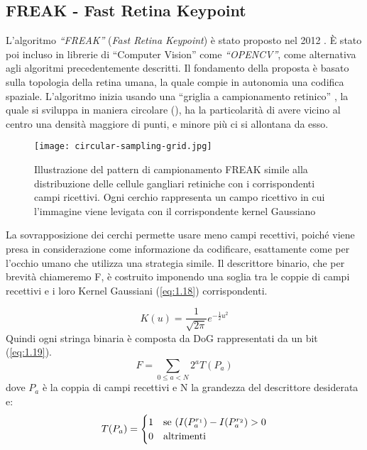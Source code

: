 \subsection{FREAK - Fast Retina Keypoint}
L'algoritmo \textit{``FREAK''} (\textit{Fast Retina Keypoint}) è stato proposto nel 2012 \cite{6247715}. È stato poi incluso in librerie di ``Computer Vision'' come \textit{``OPENCV''}, come alternativa agli algoritmi precedentemente descritti. Il fondamento della proposta è basato sulla topologia della retina umana, la quale compie in autonomia una codifica spaziale. L'algoritmo inizia usando una ``griglia a campionamento retinico'' \cite{6247715}, la quale si sviluppa in maniera circolare (), ha la particolarità di avere vicino al centro una densità maggiore di punti, e minore più ci si allontana da esso.
\begin{figure}[H]
    \centering
    \texttt{[image: circular-sampling-grid.jpg]}
    \caption{Illustrazione del pattern di campionamento FREAK simile alla distribuzione delle cellule gangliari retiniche con i corrispondenti campi ricettivi. Ogni cerchio rappresenta un campo ricettivo in cui l'immagine viene levigata con il corrispondente kernel Gaussiano \cite{6247715}}
    \label{fig:5}
\end{figure}
\noindent La sovrapposizione dei cerchi permette usare meno campi recettivi, poiché viene presa in considerazione come informazione da codificare, esattamente come per l'occhio umano che utilizza una strategia simile.  Il descrittore binario, che per brevità chiameremo F, è costruito imponendo una soglia tra le coppie di campi recettivi e i loro Kernel Gaussiani (\ref{eq:1.18}) corrispondenti. \par
\begin{equation}
    {\displaystyle K(u)={\frac {1}{\sqrt {2\pi }}}e^{-{\frac {1}{2}}u^{2}}} \label{eq:1.18}
\end{equation}
\noindent Quindi ogni stringa binaria è composta da DoG rappresentati da un bit (\ref{eq:1.19}).
\begin{equation}
    F=\sum_{0\leq a < N}2^{a}T(P_{a}) \label{eq:1.19}
\end{equation}
\noindent dove \textit{\(P_{a}\)} è la coppia di campi recettivi e N la grandezza del descrittore desiderata e:
\begin{equation}
    T(P_{a})=\begin{cases}
       1 & \text{se \( (I(P_{a}^{r_{1}})-I(P_{a}^{r_{2}}) > 0 \)}  \\
       0 & \text{altrimenti}
    \end{cases}
\end{equation}
